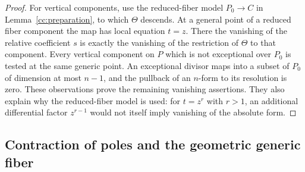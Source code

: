 \begin{proof}
For vertical components, use the reduced-fiber model $P_0\to C$ in
Lemma~\ref{cc:preparation}, to which $\Theta$ descends.  At a general
point of a reduced fiber component the map has local equation $t=z$.
There the vanishing of the relative coefficient $s$ is exactly the
vanishing of the restriction of $\Theta$ to that component.  Every
vertical component on $P$ which is not exceptional over $P_0$ is tested
at the same generic point.  An exceptional divisor maps into a subset
of $P_0$ of dimension at most $n-1$, and the pullback of an $n$-form to
its resolution is zero.  These observations prove the remaining
vanishing assertions.  They also explain why the reduced-fiber model
is used: for $t=z^r$ with $r>1$, an additional differential factor
$z^{r-1}$ would not itself imply vanishing of the absolute form.
\end{proof}



\subsection{Contraction of poles and the geometric generic fiber}

